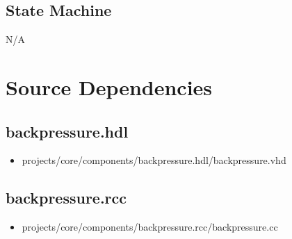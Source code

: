 \documentclass{article}
\def\comp{backpressure}
\begin{document}
\subsection*{State Machine}
	N/A

\section*{Source Dependencies}
\subsection*{\comp.hdl}
\begin{itemize}
	\item projects/core/components/backpressure.hdl/backpressure.vhd
\end{itemize}

\subsection*{\comp.rcc}
\begin{itemize}
	\item projects/core/components/backpressure.rcc/backpressure.cc
\end{itemize}
\end{document}
